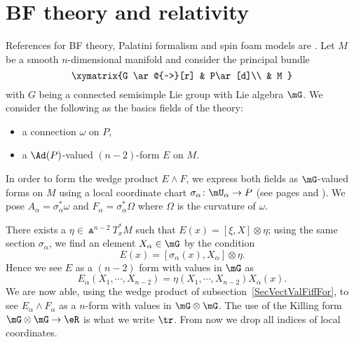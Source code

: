 \section{BF theory and relativity}

References for BF theory, Palatini formalism and spin foam models are \cite{bkindep,degesols,itospinfoam,BenyAshHamil}. Let $M$ be a smooth $n$-dimensional manifold and consider the principal bundle
\begin{equation}
\xymatrix{%
 G   \ar@{~>}[r]		&	P\ar[d]\\
   				&	M
 }
\end{equation}
with $G$ being a connected semisimple Lie group with Lie algebra $\mG$. We consider the following as the basics fields of the theory:
\begin{itemize}
\item a connection $\omega$ on $P$,
\item a $\Ad(P)$-valued $(n-2)$-form $E$ on $M$.
\end{itemize}
In order to form the wedge product $E\wedge F$, we express both fields as $\mG$-valued forms on $M$ using a local coordinate chart $\sigma_{\alpha}\colon \mU_{\alpha}\to P$ (see pages \pageref{PgLocSecCurv} and \pageref{PgLocSecConn} ). We pose $A_{\alpha}=\sigma_{\alpha}^*\omega$ and $F_{\alpha}=\sigma_{\alpha}^*\Omega$ where $\Omega$ is the curvature of $\omega$.

There exists a $\eta\in\Wedge^{n-2}T_x^*M$ such that $E(x)=[\xi,X]\otimes\eta$; using the same section $\sigma_{\alpha}$, we find an element $X_{\alpha}\in\mG$ by the condition
\[
  E(x)=[\sigma_{\alpha}(x),X_{\alpha}]\otimes\eta.
\]
Hence we see $E$ as a $(n-2)$ form with values in $\mG$ as
\begin{equation}
E_{\alpha}(X_1,\cdots,X_{n-2})=\eta(X_1,\cdots,X_{n-2})X_{\alpha}(x).
\end{equation}
We are now able, using the wedge product of subsection~\ref{SecVectValFiffFor}, to see $E_{\alpha}\wedge F_{\alpha}$ as a $n$-form with values in $\mG\otimes\mG$. The use of the Killing form $\mG\otimes\mG\to\eR$ is what we write $\tr$. From now we drop all indices of local coordinates.

